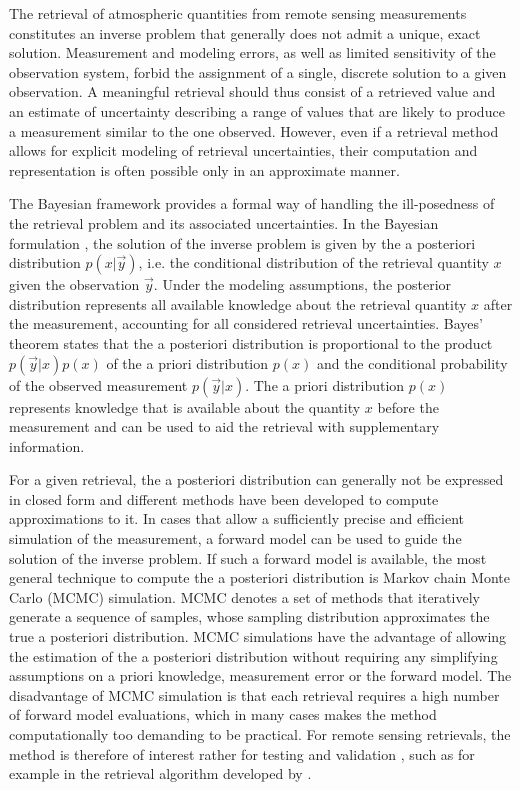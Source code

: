 \documentclass[journal abbreviation, manuscript]{copernicus}
\begin{document}


\introduction  %

The retrieval of atmospheric quantities from remote sensing measurements
constitutes an inverse problem that generally does not admit a unique, exact
solution. Measurement and modeling errors, as well as limited sensitivity of the
observation system, forbid the assignment of a single, discrete solution to a
given observation. A meaningful retrieval should thus consist of a retrieved
value and an estimate of uncertainty describing a range of values that are
likely to produce a measurement similar to the one observed. However, even
if a retrieval method allows for explicit modeling of retrieval uncertainties,
their computation and representation is often possible only in an approximate
manner.

The Bayesian framework provides a formal way of handling the ill-posedness of
the retrieval problem and its associated uncertainties. In the Bayesian
formulation \citep{rodgers}, the solution of the inverse problem is given by the
a posteriori distribution $p(x | \vec{y})$, i.e. the conditional distribution of
the retrieval quantity $x$ given the observation $\vec{y}$. Under the modeling
assumptions, the posterior distribution represents all available knowledge about
the retrieval quantity $x$ after the measurement, accounting for all considered
retrieval uncertainties. Bayes' theorem states that the a posteriori
distribution is proportional to the product $p(\vec{y} | x)p(x)$ of the a priori
distribution $p(x)$ and the conditional probability of the observed measurement
$p(\vec{y} | x)$. The a priori distribution $p(x)$ represents knowledge that is
available about the quantity $x$ before the measurement and can be used to aid
the retrieval with supplementary information.

For a given retrieval, the a posteriori distribution can generally not be
expressed in closed form and different methods have been developed to compute
approximations to it. In cases that allow a sufficiently precise and efficient
simulation of the measurement, a forward model can be used to guide the solution
of the inverse problem. If such a forward model is available, the most general
technique to compute the a posteriori distribution is Markov chain Monte Carlo
(MCMC) simulation. MCMC denotes a set of methods that iteratively generate a
sequence of samples, whose sampling distribution approximates the true a
posteriori distribution. MCMC simulations have the advantage of allowing the
estimation of the a posteriori distribution without requiring any simplifying
assumptions on a priori knowledge, measurement error or the forward model.  The
 disadvantage of MCMC simulation is that each retrieval requires a
high number of forward model evaluations, which in many cases makes the method
computationally too demanding to be practical. For remote sensing retrievals, the
method is therefore of interest rather for testing and validation \citep{tamminen}, such
as for example in the retrieval algorithm developed by \cite{evans_2}.
\end{document}
